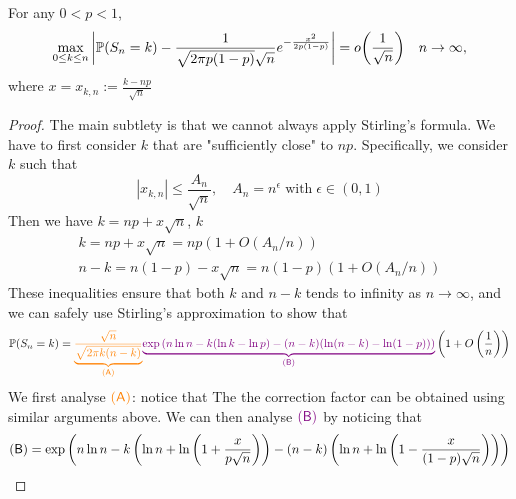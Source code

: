 \begin{theorem}
For any $0 < p < 1$,
\begin{equation}
    \max_{0 \le k \le n} \bigg|  \mathbb{P}(S_n = k) - \frac{1}{\sqrt{2 \pi p (1-p)} \sqrt{n}} e^{-\frac{x^2}{2p(1-p)}}  \bigg| = o\bigg(\frac{1}{\sqrt{n}}\bigg) \quad n \rightarrow \infty,
\end{equation}
where $\displaystyle{x = x_{k,n} := \frac{k-np}{\sqrt{n}}}$ 
\end{theorem}
\begin{proof}
The main subtlety is that we cannot always apply Stirling's formula. We have to first consider $k$ that are "sufficiently close" to $np$. Specifically, we consider $k$ such that
\begin{equation}
    |x_{k,n}| \leq \frac{A_n}{\sqrt{n}}, \quad A_n = n^\epsilon \; \text{with} \; \epsilon \in (0,1)
\end{equation}
Then we have $k = np+x\sqrt{n}$, $k$
\begin{gather*}
    k = np+x\sqrt{n} = np(1+O(A_n/n))\\
    n-k = n(1-p) - x\sqrt{n} = n(1-p)(1+O(A_n/n))
\end{gather*}
These inequalities ensure that both $k$ and $n-k$ tends to infinity as $n \to \infty$, and we can safely use Stirling's approximation to show that
\begin{align*}
    \mathbb{P}(S_n = k) = \textcolor{orange}{\underbrace{\frac{\sqrt{n}}{\sqrt{2\pi k(n-k)}}}_{\mathsf{(A)}}} \textcolor{violet}{\underbrace{\exp\left( n \ln n - k (\ln k - \ln p) - (n-k) (\ln (n-k) - \ln (1-p)) \right)}_{\mathsf{(B)}}} \left( 1+O\left( \frac{1}{n} \right) \right)
\end{align*}
We first analyse $\textcolor{orange}{\mathsf{(A)}}$: notice that
The the correction factor can be obtained using similar arguments above. We can then analyse $\textcolor{violet}{\mathsf{(B)}}$ by noticing that 
\textcolor{violet}{
\begin{align*}
    \mathsf{(B)} &= \exp\bracket{n \ln n - k\bracket{\ln n + \ln\bracket{1+\frac{x}{p\sqrt{n}}}} - (n-k)\bracket{\ln n + \ln\bracket{1-\frac{x}{(1-p)\sqrt{n}}}}} \\

\end{align*}}
\end{proof}
